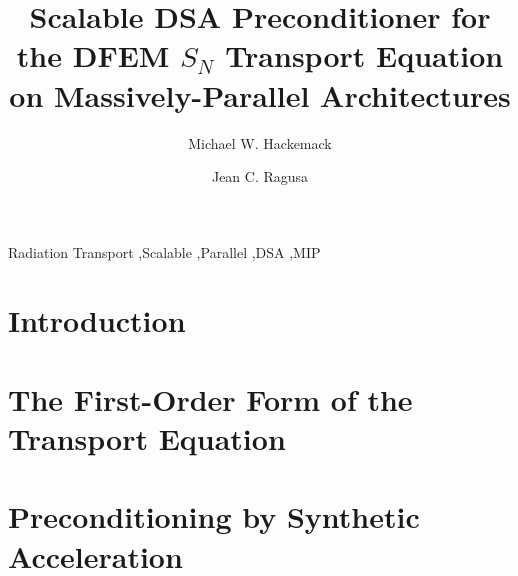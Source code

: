 \documentclass[preprint,review,12pt]{elsarticle}
\begin{document}
\begin{frontmatter}
\title{Scalable DSA Preconditioner for the DFEM $S_N$ Transport Equation on Massively-Parallel Architectures}
\author{Michael W. Hackemack}
\author{Jean C. Ragusa}
\address{Department of Nuclear Engineering, Texas A\&M University, College Station, TX 77843, USA}
\begin{abstract}

\end{abstract}
\begin{keyword}
Radiation Transport \sep Scalable \sep Parallel \sep DSA \sep MIP
\end{keyword}
\end{frontmatter}

\linenumbers

\section{Introduction} \label{sec::intro}

\section{The First-Order Form of the Transport Equation} \label{sec::trans}

\section{Preconditioning by Synthetic Acceleration} \label{sec::accel}
\end{document}
